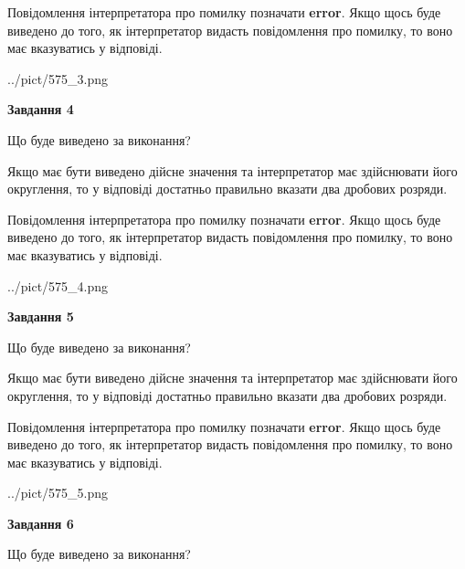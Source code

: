 \documentclass[12pt, ukrainian]{article}
\begin{document}
{\begin {Large}
Повідомлення інтерпретатора про помилку позначати \textbf{error}.
Якщо щось буде виведено до того, як інтерпретатор видасть повідомлення про помилку, 
то воно має вказуватись у відповіді. \par

\begin{center}
	{../pict/575_3.png}
\end{center}
\newpage

{\begin {center}\textbf{Завдання 4}\end {center}}\par
Що буде виведено за виконання? \par

Якщо має бути виведено дійсне значення та інтерпретатор має здійснювати його округлення, 
то у відповіді достатньо правильно вказати два дробових розряди.

Повідомлення інтерпретатора про помилку позначати \textbf{error}.
Якщо щось буде виведено до того, як інтерпретатор видасть повідомлення про помилку, 
то воно має вказуватись у відповіді. \par

\begin{center}
	{../pict/575_4.png}
\end{center}
\newpage

{\begin {center}\textbf{Завдання 5}\end {center}}\par
Що буде виведено за виконання? \par

Якщо має бути виведено дійсне значення та інтерпретатор має здійснювати його округлення, 
то у відповіді достатньо правильно вказати два дробових розряди.

Повідомлення інтерпретатора про помилку позначати \textbf{error}.
Якщо щось буде виведено до того, як інтерпретатор видасть повідомлення про помилку, 
то воно має вказуватись у відповіді. \par

\begin{center}
	{../pict/575_5.png}
\end{center}
\newpage

{\begin {center}\textbf{Завдання 6}\end {center}}\par
Що буде виведено за виконання? \par


\end{Large}}
\end{document}
